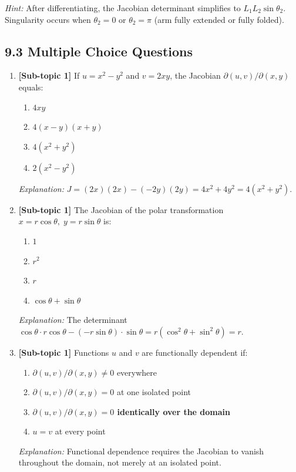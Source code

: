 \documentclass[12pt,a4paper]{article}
\begin{document}
\begin{enumerate}[leftmargin=*, label=\textbf{D\arabic*.}]
  \textit{Hint:} After differentiating, the Jacobian determinant simplifies to \( L_1 L_2 \sin\theta_2 \). Singularity occurs when \( \theta_2 = 0 \) or \( \theta_2 = \pi \) (arm fully extended or fully folded).

\end{enumerate}

\subsection*{9.3 Multiple Choice Questions}

\begin{enumerate}[leftmargin=*, label=\textbf{MCQ\arabic*.}]

  \item \textbf{[Sub-topic 1]} If \( u = x^{2}-y^{2} \) and \( v = 2xy \), the Jacobian \( \partial(u,v)/\partial(x,y) \) equals:
  \begin{enumerate}[label=(\Alph*)]
    \item \( 4xy \)
    \item \( 4(x-y)(x+y) \)
    \item \textbf{\( 4(x^{2}+y^{2}) \)}
    \item \( 2(x^{2}-y^{2}) \)
  \end{enumerate}
  \textit{Explanation:} \( J = (2x)(2x)-(-2y)(2y) = 4x^2+4y^2 = 4(x^2+y^2) \).

  \item \textbf{[Sub-topic 1]} The Jacobian of the polar transformation \( x = r\cos\theta,\; y = r\sin\theta \) is:
  \begin{enumerate}[label=(\Alph*)]
    \item \( 1 \)
    \item \( r^{2} \)
    \item \textbf{\( r \)}
    \item \( \cos\theta + \sin\theta \)
  \end{enumerate}
  \textit{Explanation:} The determinant \( \cos\theta\cdot r\cos\theta - (-r\sin\theta)\cdot\sin\theta = r(\cos^2\theta+\sin^2\theta) = r \).

  \item \textbf{[Sub-topic 1]} Functions \( u \) and \( v \) are functionally dependent if:
  \begin{enumerate}[label=(\Alph*)]
    \item \( \partial(u,v)/\partial(x,y) \neq 0 \) everywhere
    \item \( \partial(u,v)/\partial(x,y) = 0 \) at one isolated point
    \item \textbf{\( \partial(u,v)/\partial(x,y) = 0 \) identically over the domain}
    \item \( u = v \) at every point
  \end{enumerate}
  \textit{Explanation:} Functional dependence requires the Jacobian to vanish throughout the domain, not merely at an isolated point.


\end{enumerate}
\end{document}
